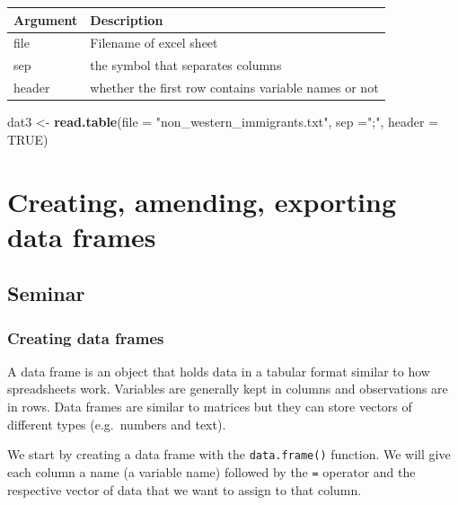 \documentclass[]{article}
\newenvironment{Shaded}{\begin{snugshade}}{\end{snugshade}}
\newcommand{\DataTypeTok}[1]{\textcolor[rgb]{0.13,0.29,0.53}{#1}}
\newcommand{\KeywordTok}[1]{\textcolor[rgb]{0.13,0.29,0.53}{\textbf{#1}}}
\newcommand{\NormalTok}[1]{#1}
\newcommand{\OtherTok}[1]{\textcolor[rgb]{0.56,0.35,0.01}{#1}}
\newcommand{\StringTok}[1]{\textcolor[rgb]{0.31,0.60,0.02}{#1}}
\begin{document}
\begin{longtable}[]{@{}ll@{}}
\toprule
Argument & Description\tabularnewline
\midrule
\endhead
file & Filename of excel sheet\tabularnewline
sep & the symbol that separates columns\tabularnewline
header & whether the first row contains variable names or not\tabularnewline
\bottomrule
\end{longtable}

\begin{Shaded}
\begin{Highlighting}[]
\NormalTok{dat3 <-}\StringTok{ }\KeywordTok{read.table}\NormalTok{(}\DataTypeTok{file =} \StringTok{"non_western_immigrants.txt"}\NormalTok{, }\DataTypeTok{sep =}\StringTok{";"}\NormalTok{, }\DataTypeTok{header =} \OtherTok{TRUE}\NormalTok{)}
\end{Highlighting}
\end{Shaded}

\hypertarget{creating-amending-exporting-data-frames}{%
\section{Creating, amending, exporting data frames}\label{creating-amending-exporting-data-frames}}

\hypertarget{seminar-2}{%
\subsection{Seminar}\label{seminar-2}}

\hypertarget{creating-data-frames}{%
\subsubsection{Creating data frames}\label{creating-data-frames}}

A data frame is an object that holds data in a tabular format similar to how spreadsheets work. Variables are generally kept in columns and observations are in rows. Data frames are similar to matrices but they can store vectors of different types (e.g.~numbers and text).

We start by creating a data frame with the \texttt{data.frame()} function. We will give each column a name (a variable name) followed by the \texttt{=} operator and the respective vector of data that we want to assign to that column.
\end{document}
